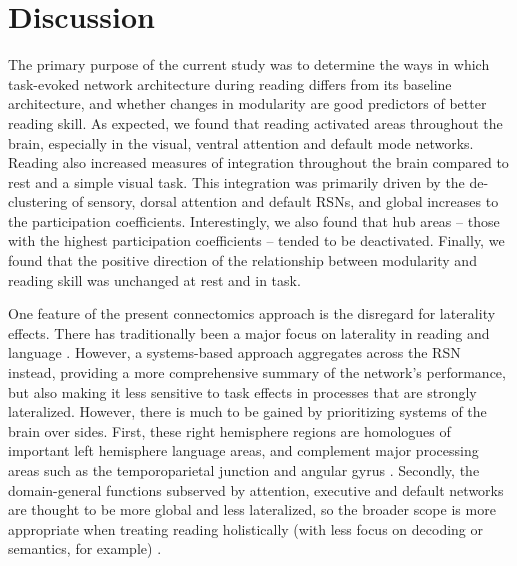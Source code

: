 \section{Discussion}

The primary purpose of the current study was to determine the ways in which task-evoked network architecture during reading differs from its baseline architecture, and whether changes in modularity are good predictors of better reading skill. As expected, we found that reading activated areas throughout the brain, especially in the visual, ventral attention and default mode networks. Reading also increased measures of integration throughout the brain compared to rest and a simple visual task. This integration was primarily driven by the de-clustering of sensory, dorsal attention and default RSNs, and global increases to the participation coefficients. Interestingly, we also found that hub areas -- those with the highest participation coefficients -- tended to be deactivated. Finally, we found that the positive direction of the relationship between modularity and reading skill was unchanged at rest and in task.

One feature of the present connectomics approach is the disregard for laterality effects. There has traditionally been a major focus on laterality in reading and language \citep{Martin2015}. However, a systems-based approach aggregates across the RSN instead, providing a more comprehensive summary of the network's performance, but also making it less sensitive to task effects in processes that are strongly lateralized. However, there is much to be gained by prioritizing systems of the brain over sides. First, these right hemisphere regions are homologues of important left hemisphere language areas, and complement major processing areas such as the temporoparietal junction and angular gyrus \citep{Price2012, Jung-Beeman2005}. Secondly, the domain-general functions subserved by attention, executive and default networks are thought to be more global and less lateralized, so the broader scope is more appropriate when treating reading holistically (with less focus on decoding or semantics, for example) \citep{Yeo2011}.  

